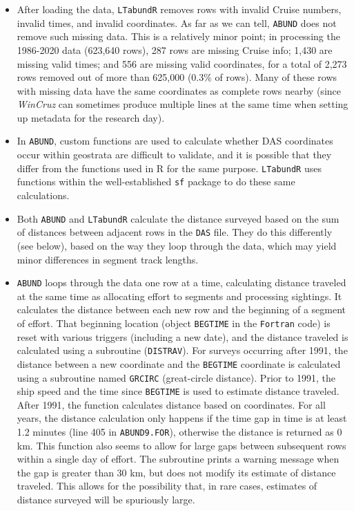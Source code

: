 \documentclass[
]{book}
\begin{document}
\begin{itemize}
\item
  After loading the data, \texttt{LTabundR} removes rows with invalid Cruise numbers, invalid times, and invalid coordinates. As far as we can tell, \texttt{ABUND} does not remove such missing data. This is a relatively minor point; in processing the 1986-2020 data (623,640 rows), 287 rows are missing Cruise info; 1,430 are missing valid times; and 556 are missing valid coordinates, for a total of 2,273 rows removed out of more than 625,000 (0.3\% of rows). Many of these rows with missing data have the same coordinates as complete rows nearby (since \emph{WinCruz} can sometimes produce multiple lines at the same time when setting up metadata for the research day).
\item
  In \texttt{ABUND}, custom functions are used to calculate whether DAS coordinates occur within geostrata are difficult to validate, and it is possible that they differ from the functions used in R for the same purpose. \texttt{LTabundR} uses functions within the well-established \texttt{sf} package to do these same calculations.
\item
  Both \texttt{ABUND} and \texttt{LTabundR} calculate the distance surveyed based on the sum of distances between adjacent rows in the \texttt{DAS} file. They do this differently (see below), based on the way they loop through the data, which may yield minor differences in segment track lengths.
\item
  \texttt{ABUND} loops through the data one row at a time, calculating distance traveled at the same time as allocating effort to segments and processing sightings. It calculates the distance between each new row and the beginning of a segment of effort. That beginning location (object \texttt{BEGTIME} in the \texttt{Fortran} code) is reset with various triggers (including a new date), and the distance traveled is calculated using a subroutine (\texttt{DISTRAV}). For surveys occurring after 1991, the distance between a new coordinate and the \texttt{BEGTIME} coordinate is calculated using a subroutine named \texttt{GRCIRC} (great-circle distance). Prior to 1991, the ship speed and the time since \texttt{BEGTIME} is used to estimate distance traveled. After 1991, the function calculates distance based on coordinates. For all years, the distance calculation only happens if the time gap in time is at least 1.2 minutes (line 405 in \texttt{ABUND9.FOR}), otherwise the distance is returned as 0 km. This function also seems to allow for large gaps between subsequent rows within a single day of effort. The subroutine prints a warning message when the gap is greater than 30 km, but does not modify its estimate of distance traveled. This allows for the possibility that, in rare cases, estimates of distance surveyed will be spuriously large.

\end{itemize}
\end{document}
